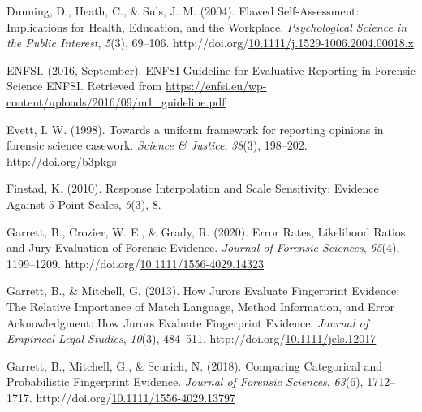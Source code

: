 \documentclass[print]{nuthesis}
\newlength{\cslhangindent}
\newenvironment{CSLReferences}[2]%
{\setlength{\parindent}{0pt}%
\everypar{\setlength{\hangindent}{\cslhangindent}}\ignorespaces}%
{\par}
\begin{document}
\begin{CSLReferences}{1}{0}
\leavevmode{}%
Dunning, D., Heath, C., \& Suls, J. M. (2004). Flawed {Self}-{Assessment}: {Implications} for {Health}, {Education}, and the {Workplace}. \emph{Psychological Science in the Public Interest}, \emph{5}(3), 69--106. http://doi.org/\href{https://doi.org/10.1111/j.1529-1006.2004.00018.x}{10.1111/j.1529-1006.2004.00018.x}

\leavevmode{}%
ENFSI. (2016, September). {ENFSI} {Guideline} for {Evaluative} {Reporting} in {Forensic} {Science} {\textbar} {ENFSI}. Retrieved from \url{https://enfsi.eu/wp-content/uploads/2016/09/m1_guideline.pdf}

\leavevmode{}%
Evett, I. W. (1998). Towards a uniform framework for reporting opinions in forensic science casework. \emph{Science \& Justice}, \emph{38}(3), 198--202. http://doi.org/\href{https://doi.org/b3pkgs}{b3pkgs}

\leavevmode{}%
Finstad, K. (2010). Response {Interpolation} and {Scale} {Sensitivity}: {Evidence} {Against} 5-{Point} {Scales}, \emph{5}(3), 8.

\leavevmode{}%
Garrett, B., Crozier, W. E., \& Grady, R. (2020). Error {Rates}, {Likelihood} {Ratios}, and {Jury} {Evaluation} of {Forensic} {Evidence}. \emph{Journal of Forensic Sciences}, \emph{65}(4), 1199--1209. http://doi.org/\href{https://doi.org/10.1111/1556-4029.14323}{10.1111/1556-4029.14323}

\leavevmode{}%
Garrett, B., \& Mitchell, G. (2013). How {Jurors} {Evaluate} {Fingerprint} {Evidence}: {The} {Relative} {Importance} of {Match} {Language}, {Method} {Information}, and {Error} {Acknowledgment}: {How} {Jurors} {Evaluate} {Fingerprint} {Evidence}. \emph{Journal of Empirical Legal Studies}, \emph{10}(3), 484--511. http://doi.org/\href{https://doi.org/10.1111/jels.12017}{10.1111/jels.12017}

\leavevmode{}%
Garrett, B., Mitchell, G., \& Scurich, N. (2018). Comparing {Categorical} and {Probabilistic} {Fingerprint} {Evidence}. \emph{Journal of Forensic Sciences}, \emph{63}(6), 1712--1717. http://doi.org/\href{https://doi.org/10.1111/1556-4029.13797}{10.1111/1556-4029.13797}


\end{CSLReferences}
\end{document}
